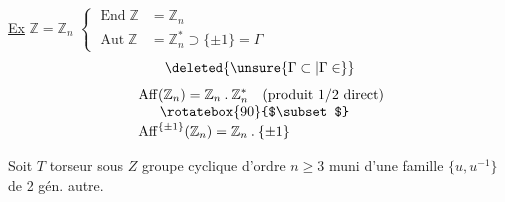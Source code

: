 \uline{Ex}\quad
$\mathbb{Z}=\mathbb{Z}_n$\quad
$\left\{\begin{aligned}
\operatorname{End}\mathbb{Z}&=\mathbb{Z}_n\\
\operatorname{Aut}\mathbb{Z}&=\mathbb{Z}_n^{*}\supset\{\pm1\}=\Gamma
\end{aligned}\right.$
\[
\deleted{\unsure{\Gamma\subset|\Gamma\in}}
\]
\[
\begin{aligned}
&\operatorname{Aff}(\mathbb{Z}_n)=\mathbb{Z}_n\mathbin{.}\mathbb{Z}_n^{*}
 \quad\text{(produit $1/2$ direct)}\\[-.3em]
&\hspace{1.7em}\rotatebox{90}{$\subset$}\\[-.3em]
&\operatorname{Aff}^{\{\pm1\}}(\mathbb{Z}_n)=\mathbb{Z}_n\mathbin{.}\{\pm1\}
\end{aligned}
\]

Soit $T$ torseur sous $Z$ groupe cyclique d'ordre $n\geq3$ muni d'une famille $\{u,u^{-1}\}$ de 2 gén. autre.

